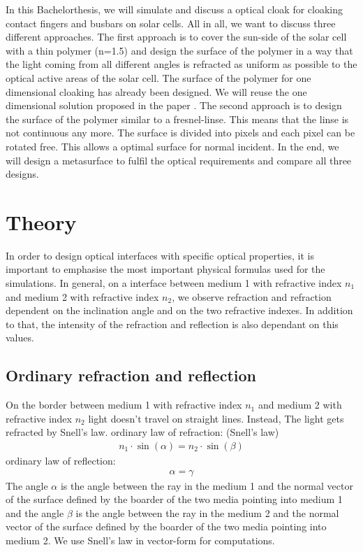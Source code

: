 In this Bachelorthesis, we will simulate and discuss a optical cloak for cloaking contact fingers and busbars on solar cells. All in all, we want to discuss three different approaches. The first approach is to cover the sun-side of the solar cell with a thin polymer (n=1.5) and design the surface of the polymer in a way that the light coming from all different angles is refracted as uniform as possible to the optical active areas of the solar cell. The surface of the polymer for one dimensional cloaking has already been designed. We will reuse the one dimensional solution proposed in the paper \cite{schumann2015cloaked}.
The second approach is to design the surface of the polymer similar to a fresnel-linse. This means that the linse is not continuous any more. The surface is divided into pixels and each pixel can be rotated free. This allows a optimal surface for normal incident. 
In the end, we will design a metasurface to fulfil the optical requirements and compare all three designs. 
\section{Theory}
In order to design optical interfaces with specific optical properties, it is important to emphasise the most important physical formulas used for the simulations. In general, on a interface between medium 1 with refractive index $n_1$ and medium 2 with refractive index $n_2$, we observe refraction and refraction dependent on the inclination angle and on the two refractive indexes. In addition to that, the intensity of the refraction and reflection is also dependant on this values. 
\subsection{Ordinary refraction and reflection \label{Snells_law_ordinary}}
On the border between medium 1 with refractive index $n_1$ and medium 2 with refractive index $n_2$ light doesn't travel on straight lines. Instead, The light gets refracted by Snell's law. 
ordinary law of refraction: (Snell's law)
\begin{align*}
n_1 \cdot \sin(\alpha) = n_2 \cdot \sin(\beta)
\end{align*}
ordinary law of reflection:
\begin{align*}
\alpha=\gamma
\end{align*}
The angle $\alpha$ is the angle between the ray in the medium 1 and the normal vector of the surface defined by the boarder of the two media pointing into medium 1 and the angle $\beta$ is the angle between the ray in the medium 2 and the normal vector of the surface defined by the boarder of the two media pointing into medium 2. 
We use Snell's law in vector-form for computations. 
